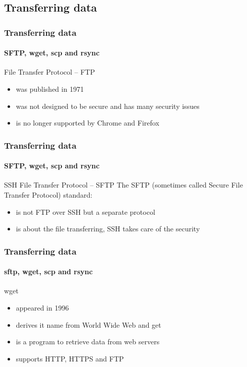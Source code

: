 \documentclass[aspectratio=169,dvipsnames]{beamer}
\begin{document}
\subsection{Transferring data}
    \begin{frame}
        \frametitle{Transferring data}
        \framesubtitle{SFTP, wget, scp and rsync}
        \begin{block}{File Transfer Protocol -- FTP}
        \begin{itemize}
            \item was \alert{published in 1971}
            \item was not designed to be secure and has \alert{many security issues}
            \item is \alert{no longer supported by Chrome and Firefox} 
        \end{itemize}
        \end{block}
    \end{frame}
    \begin{frame}
        \frametitle{Transferring data}
        \framesubtitle{SFTP, wget, scp and rsync}
        \begin{block}{SSH File Transfer Protocol -- SFTP}
        The SFTP (sometimes called Secure File Transfer Protocol) standard:
        \begin{itemize}
            \item is not FTP over SSH but a separate protocol
            \item is about the file transferring, SSH takes care of the security 
        \end{itemize}
        \end{block}
    \end{frame}
    \begin{frame}
        \frametitle{Transferring data}
        \framesubtitle{sftp, wget, scp and rsync}
        \begin{block}{wget}
            \begin{itemize}
                \item appeared in 1996
                \item derives it name from World Wide Web and get
                \item is a program to retrieve data from web servers
                \item supports HTTP, HTTPS and FTP
            \end{itemize}
        \end{block}
    \end{frame}
\end{document}
